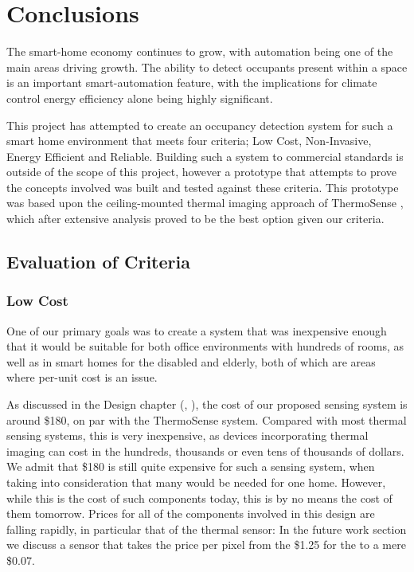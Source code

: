 \documentclass[../thesis/thesis.tex]{subfiles}
\begin{document}
 \chapter{Conclusions}

The smart-home economy continues to grow, with automation being one of the main areas driving growth. The ability to detect occupants present within a space is an important smart-automation feature, with the implications for climate control energy efficiency alone being highly significant.

This project has attempted to create an occupancy detection system for such a smart home environment that meets four criteria; Low Cost, Non-Invasive, Energy Efficient and Reliable. Building such a system to commercial standards is outside of the scope of this project, however a prototype that attempts to prove the concepts involved was built and tested against these criteria. This prototype was based upon the ceiling-mounted thermal imaging approach of ThermoSense \cite{beltran2013thermosense}, which after extensive analysis proved to be the best option given our criteria.

\section{Evaluation of Criteria}

\subsection{Low Cost}
One of our primary goals was to create a system that was inexpensive enough that it would be suitable for both office environments with hundreds of rooms, as well as in smart homes for the disabled and elderly, both of which are areas where per-unit cost is an issue.

As discussed in the Design chapter (, ), the cost of our proposed sensing system is around \$180, on par with the ThermoSense system. Compared with most thermal sensing systems, this is very inexpensive, as devices incorporating thermal imaging can cost in the hundreds, thousands or even tens of thousands of dollars. We admit that \$180 is still quite expensive for such a sensing system, when taking into consideration that many would be needed for one home. However, while this is the cost of such components today, this is by no means the cost of them tomorrow. Prices for all of the components involved in this design are falling rapidly, in particular that of the thermal sensor: In the future work section we discuss a sensor that takes the price per pixel from the \$1.25 for the \mlx to a mere \$0.07.
\end{document}
